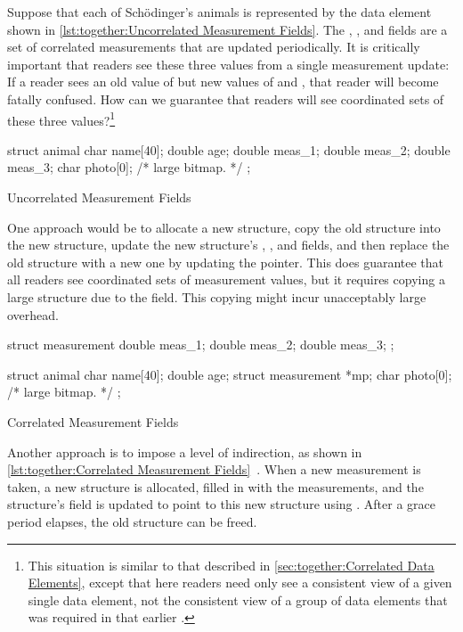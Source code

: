 Suppose that each of Sch\"odinger's animals is represented by the
data element shown in
\cref{lst:together:Uncorrelated Measurement Fields}.
The , , and  fields are a set
of correlated measurements that are updated periodically.
It is critically important that readers see these three values from
a single measurement update: If a reader sees an old value of
 but new values of  and , that
reader will become fatally confused.
How can we guarantee that readers will see coordinated sets of these
three values?\footnote{
	This situation is similar to that described in
	\cref{sec:together:Correlated Data Elements},
	except that here readers need only see a consistent view of a
	given single data element, not the consistent view of a
	group of data elements that was required in that earlier
	.}

\begin{listing}[tbp]
\begin{VerbatimL}[tabsize=8]
struct animal {
	char name[40];
	double age;
	double meas_1;
	double meas_2;
	double meas_3;
	char photo[0]; /* large bitmap. */
};
\end{VerbatimL}
\caption{Uncorrelated Measurement Fields}
\label{lst:together:Uncorrelated Measurement Fields}
\end{listing}

One approach would be to allocate a new  structure,
copy the old structure into the new structure, update the new
structure's , , and  fields,
and then replace the old structure with a new one by updating
the pointer.
This does guarantee that all readers see coordinated sets of
measurement values, but it requires copying a large structure due
to the  field.
This copying might incur unacceptably large overhead.

\begin{listing}[tbp]
\begin{VerbatimL}[tabsize=8]
struct measurement {
	double meas_1;
	double meas_2;
	double meas_3;
};

struct animal {
	char name[40];
	double age;
	struct measurement *mp;
	char photo[0]; /* large bitmap. */
};
\end{VerbatimL}
\caption{Correlated Measurement Fields}
\label{lst:together:Correlated Measurement Fields}
\end{listing}

Another approach is to impose a level of indirection, as shown in
\cref{lst:together:Correlated Measurement Fields}~\cite[Section 5.3.4]{PaulEdwardMcKenneyPhD}.
When a new measurement is taken, a new  structure
is allocated, filled in with the measurements, and the 
structure's  field is updated to point to this new
 structure using .
After a grace period elapses, the old  structure
can be freed.

